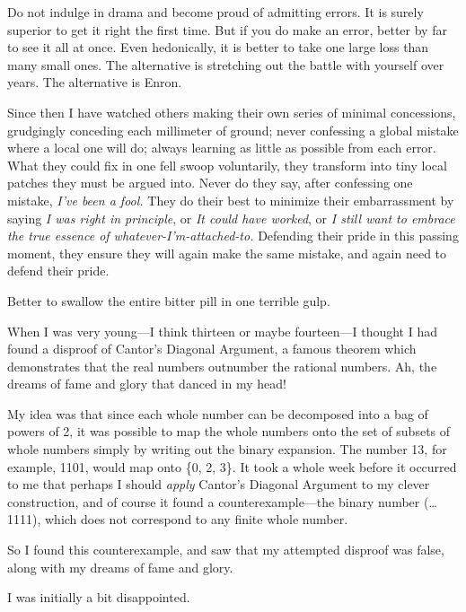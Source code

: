 {
 Do not indulge in drama and become proud of admitting errors. It
is surely superior to get it right the first time. But if you do make
an error, better by far to see it all at once. Even hedonically, it is
better to take one large loss than many small ones. The alternative is
stretching out the battle with yourself over years. The alternative is
Enron.}

{
 Since then I have watched others making their own series of
minimal concessions, grudgingly conceding each millimeter of ground;
never confessing a global mistake where a local one will do; always
learning as little as possible from each error. What they could fix in
one fell swoop voluntarily, they transform into tiny local patches they
must be argued into. Never do they say, after confessing one mistake,
\textit{I've been a fool.} They do their best to
minimize their embarrassment by saying \textit{I was right in
principle}, or \textit{It could have worked}, or \textit{I still want
to embrace the true essence of
whatever-I'm-attached-to.} Defending their pride in
this passing moment, they ensure they will again make the same mistake,
and again need to defend their pride.}

{
 Better to swallow the entire bitter pill in one terrible gulp.}

\myendsectiontext


{
 When I was very young---I think thirteen or maybe fourteen---I
thought I had found a disproof of Cantor's Diagonal
Argument, a famous theorem which demonstrates that the real numbers
outnumber the rational numbers. Ah, the dreams of fame and glory that
danced in my head! }

{
 My idea was that since each whole number can be decomposed into a
bag of powers of 2, it was possible to map the whole numbers onto the
set of subsets of whole numbers simply by writing out the binary
expansion. The number 13, for example, 1101, would map onto
\{0, 2,
3\}. It took a whole week before it
occurred to me that perhaps I should \textit{apply}
Cantor's Diagonal Argument to my clever construction,
and of course it found a counterexample---the binary number (\ldots
1111), which does not correspond to any finite whole number.}

{
 So I found this counterexample, and saw that my attempted disproof
was false, along with my dreams of fame and glory.}

{
 I was initially a bit disappointed.}

